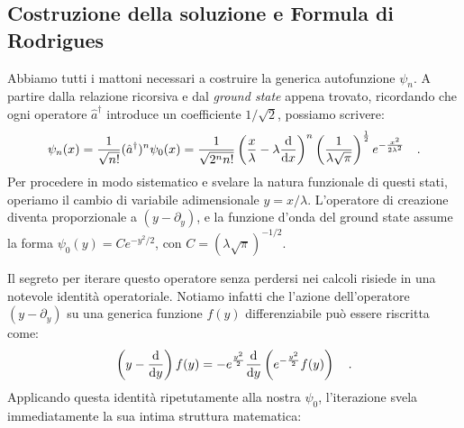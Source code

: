 \subsection{Costruzione della soluzione e Formula di Rodrigues}
Abbiamo tutti i mattoni necessari a costruire la generica autofunzione $\psi_n$. A partire dalla relazione ricorsiva e dal \emph{ground state} appena trovato, ricordando che ogni operatore $\hat{a}^\dagger$ introduce un coefficiente $1/\sqrt{2}$, possiamo scrivere:
\[
    \psi_n(x) = \frac{1}{\sqrt{n!}}(\hat{a}^\dagger)^n \psi_0(x) = \frac{1}{\sqrt{2^n n!}}\left( \frac{x}{\lambda} - \lambda \dv{}{x} \right)^n \left(\frac{1}{\lambda\sqrt{\pi}}\right)^{\frac{1}{2}}e^{-\frac{x^2}{2\lambda^2}} \quad.
\]
Per procedere in modo sistematico e svelare la natura funzionale di questi stati, operiamo il cambio di variabile adimensionale $y = x/\lambda$. L'operatore di creazione diventa proporzionale a $(y - \partial_y)$, e la funzione d'onda del ground state assume la forma $\psi_0(y) = C e^{-y^2/2}$, con $C = (\lambda\sqrt{\pi})^{-1/2}$.

Il segreto per iterare questo operatore senza perdersi nei calcoli risiede in una notevole identità operatoriale. Notiamo infatti che l'azione dell'operatore $(y - \partial_y)$ su una generica funzione $f(y)$ differenziabile può essere riscritta come:
\[
    \left( y - \dv{}{y} \right) f(y) = -e^{\frac{y^2}{2}} \dv{}{y} \left( e^{-\frac{y^2}{2}} f(y) \right) \quad.
\]
Applicando questa identità ripetutamente alla nostra $\psi_0$, l'iterazione svela immediatamente la sua intima struttura matematica:

